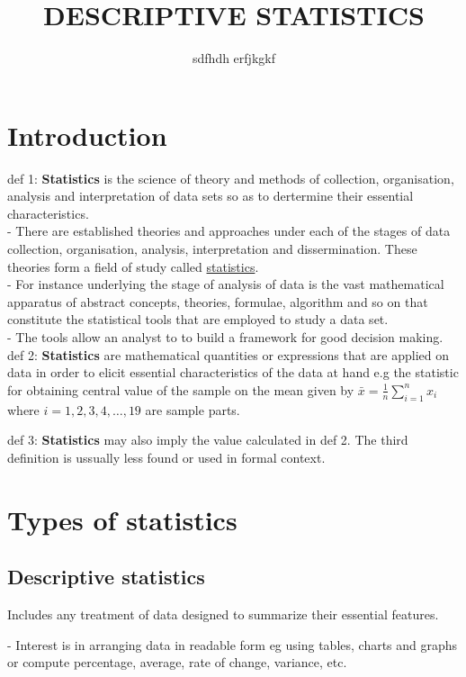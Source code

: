 \documentclass[12pt,a4paper]{article}
\title{DESCRIPTIVE STATISTICS}
\author{sdfhdh erfjkgkf}
\begin{document}
%
\maketitle
\newpage
\tableofcontents
\newpage
\section{Introduction}
\setlength{\parskip}{0.5em} %
def 1: \textbf{Statistics} is the science of theory and methods of collection, organisation, analysis and interpretation of data sets so as to dertermine their essential characteristics. \\ - There are established theories and approaches under each of the stages of data collection, organisation, analysis, interpretation and dissermination. These theories form a field of study called \underline{statistics}. \\ - For instance underlying the stage of analysis of data is the vast mathematical apparatus of abstract concepts, theories, formulae, algorithm and so on that constitute the statistical tools that are employed to study a data set. \\ - The tools allow an analyst to to build a framework for good decision making.
\newline
def 2: \textbf{Statistics} are mathematical quantities or expressions that are applied on data in order to elicit essential characteristics of the data at hand e.g the statistic for obtaining central value of the sample on the mean given by $\bar{x} = \frac{1}{n}\sum_{i = 1}^{n} x_i$ where $i = 1,2,3,4, \dots,19$ are sample parts. \

def 3: \textbf{Statistics} may also imply the value calculated in def 2.
The third definition is ussually less found or used in formal context.

\section{Types of statistics}
\subsection{Descriptive statistics}
Includes any treatment of data designed to summarize their essential features.

- Interest is in arranging data in readable form eg using tables, charts and graphs or compute percentage, average, rate of change, variance, etc.
\end{document}
